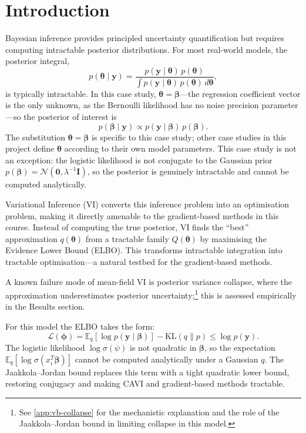 \documentclass[11pt,a4paper]{article}
\newcommand{\E}{\mathbb{E}}
\newcommand{\N}{\mathcal{N}}
\begin{document}
\section*{Introduction}

Bayesian inference provides principled uncertainty quantification but requires computing
intractable posterior distributions. For most real-world models, the posterior integral,
\begin{equation*}
  p(\bm{\theta} \mid \bm{y}) = \frac{p(\bm{y} \mid \bm{\theta})\,p(\bm{\theta})}
    {\displaystyle\int p(\bm{y} \mid \bm{\theta})\,p(\bm{\theta})\,d\bm{\theta}},
\end{equation*}
is typically intractable.
In this case study, $\bm{\theta} = \bm{\beta}$---the regression coefficient vector is
the only unknown, as the Bernoulli likelihood has no noise precision parameter---so the
posterior of interest is
\begin{equation*}
  p(\bm{\beta} \mid \bm{y}) \propto p(\bm{y} \mid \bm{\beta})\,p(\bm{\beta}).
\end{equation*}
The substitution $\bm{\theta} = \bm{\beta}$ is specific to this case study;
other case studies in this project define $\bm{\theta}$ according to their own model
parameters.
This case study is not an exception: the logistic likelihood is not conjugate to the
Gaussian prior $p(\bm{\beta})=\N(\bm{0}, \lambda^{-1}\bm{I})$, so the posterior
is genuinely intractable and cannot be computed analytically.

Variational Inference (VI) converts this inference problem into an optimisation problem,
making it directly amenable to the gradient-based methods in this course.
Instead of computing the true posterior, VI finds the ``best'' approximation $q(\bm{\theta})$
from a tractable family $Q(\bm{\theta})$ by maximising the Evidence Lower Bound (ELBO).
This transforms intractable integration into tractable optimisation---a natural testbed for
the gradient-based methods.

A known failure mode of mean-field VI is posterior variance collapse, where the
approximation underestimates posterior uncertainty;\footnote{See \ref{app:vb-collapse}
for the mechanistic explanation and the role of the Jaakkola--Jordan bound in
limiting collapse in this model.} this is assessed empirically in the Results section.

For this model the ELBO takes the form:
\begin{equation*}
  \mathcal{L}(\bm{\phi}) = \E_{q}[\log p(\bm{y}\mid\bm{\beta})] - \mathrm{KL}(q \| p)
  \leq \log p(\bm{y}).
\end{equation*}
The logistic likelihood $\log\sigma(\psi)$ is not quadratic in $\bm{\beta}$, so the
expectation $\E_q[\log\sigma(x_i^T\bm{\beta})]$ cannot be computed analytically under
a Gaussian $q$.
The Jaakkola--Jordan bound replaces this term with a tight quadratic lower bound,
restoring conjugacy and making CAVI and gradient-based methods tractable.
\end{document}

